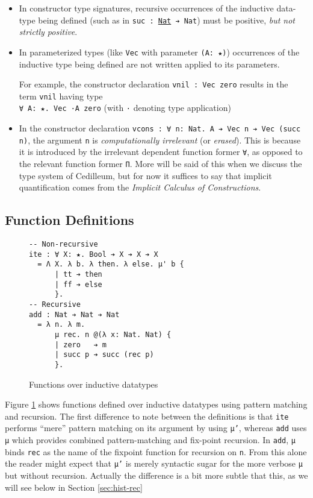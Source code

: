 \documentclass{article}
\begin{document}
\begin{itemize}
\item In constructor type signatures, recursive occurrences of the inductive
  data-type being defined (such as in \texttt{suc : \underline{Nat} ➔ Nat}) must
  be positive, \textit{but not strictly positive}.
\item In parameterized types (like \texttt{Vec} with parameter \texttt{(A: ★)})
  occurrences of the inductive type being defined are not written applied to
  its parameters.
  
  For example, the constructor declaration \texttt{vnil : Vec zero} results in
  the term \texttt{vnil} having type \\ \texttt{∀ A: ★. Vec ·A zero} (with \texttt{·}
  denoting type application)
\item In the constructor declaration \texttt{vcons : ∀ n: Nat. A ➔ Vec n ➔ Vec
    (succ n)}, the argument \texttt{n} is \textit{computationally irrelevant}
  (or \textit{erased}). This is because it is introduced by the
  irrelevant dependent function former \texttt{∀}, as opposed to the relevant
  function former \texttt{Π}. More will be said of this when we discuss the type
  system of Cedilleum, but for now it suffices to say that implicit
  quantification comes from the \textit{Implicit Calculus of
    Constructions}\cite{Mi01_ICC}.
\end{itemize}

\subsection{Function Definitions}
\begin{figure}[h]
\begin{verbatim}
-- Non-recursive
ite : ∀ X: ★. Bool ➔ X ➔ X ➔ X
  = Λ X. λ b. λ then. λ else. μ' b {
      | tt ➔ then
      | ff ➔ else
      }.
-- Recursive
add : Nat ➔ Nat ➔ Nat
  = λ n. λ m.
      μ rec. n @(λ x: Nat. Nat) {
      | zero   ➔ m
      | succ p ➔ succ (rec p)
      }.
\end{verbatim}
  \caption{Functions over inductive datatypes}
  \label{fig:ex-data-fun}
\end{figure}

Figure \ref{fig:ex-data-fun} shows functions defined over inductive datatypes
using pattern matching and recursion. The first difference to note between the
definitions is that \texttt{ite} performs ``mere''
pattern matching on its argument by using \texttt{μ'}, whereas \texttt{add}
uses \texttt{μ} which provides combined pattern-matching and fix-point
recursion. In \texttt{add}, \texttt{μ} binds \texttt{rec} as the name of the
fixpoint function for recursion on \texttt{n}. From this alone the reader might
expect that \texttt{μ'} is merely syntactic sugar for the more verbose
\texttt{μ} but without recursion. Actually the difference is a bit more subtle
that this, as we will see below in Section \ref{sec:hist-rec}
\end{document}
